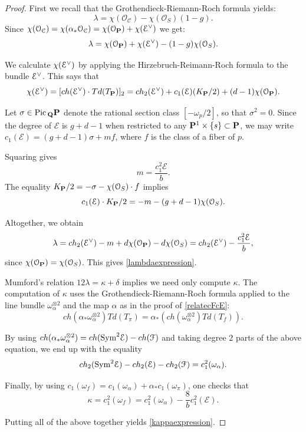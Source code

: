 \documentclass[reqno, 10 pt]{article}
\theoremstyle{definition}
\theoremstyle{remark}
\numberwithin{equation}{section}
\numberwithin{thm}{section}
\numberwithin{prop}{section}
\numberwithin{lem}{section}
\numberwithin{cor}{section}
\numberwithin{conj}{section}
\numberwithin{defn}{section}
\newcommand{\cC}{{\mathcal C}}
\newcommand{\cE}{{\mathcal E}}
\newcommand{\cF}{{\mathcal F}}
\newcommand{\cO}{{\mathcal O}}
\newcommand {\Q}{{\bf Q}}
\renewcommand{\P}{{\bf P}}
\newcommand {\Pic}{{\rm Pic}\,}
\newcommand {\Sym}{{\rm Sym}}
\begin{document}
\begin{proof}
First we recall that the Grothendieck-Riemann-Roch formula yields: 
\[\lambda = \chi (\cO_{\cC}) - \chi(\cO_{S})(1-g).\]
Since $\chi(\cO_{\cC}) = \chi(\alpha_{*}\cO_{\cC}) = \chi(\cO_{\P}) + \chi(\dual \cE)$ we get: 
\[\lambda = \chi(\cO_{\P}) + \chi(\dual \cE) - (1-g)\chi(\cO_{S}) .\]

We calculate $\chi(\dual \cE)$ by applying the Hirzebruch-Reimann-Roch formula to the bundle $\dual \cE$. This says that 
\[\chi(\dual \cE) = [ch(\dual \cE) \cdot Td(T_{\P})]_{2} = ch_{2}(\dual \cE) + c_1(\cE)(K_{\P}/2) + (d-1)\chi(\cO_{\P}).\] 

Let $\sigma \in \Pic_{\Q} \P$ denote the rational section class $[-\omega_{p}/2]$, so that $\sigma^{2} = 0$.  Since the degree of $\cE$ is $g+d-1$ when restricted to any $\P^{1} \times \{s\} \subset \P$, we may write $c_{1}(\cE) = (g+d-1)\sigma + mf$, where $f$ is the class of a fiber of $p$.  

Squaring gives \[m = \frac{c_{1}^{2}\cE}{b}.\]  The equality $K_{\P}/2 = -\sigma - \chi(\cO_{S})\cdot f$ implies \[c_{1}(\cE) \cdot K_{\P}/2 = -m - (g+d-1) \chi(\cO_{S}).\]

Altogether, we obtain \[\lambda = ch_{2}(\dual \cE) - m + d\chi(\cO_{\P}) - d\chi(\cO_{S}) = ch_{2}(\dual \cE) - \frac{c_{1}^{2}\cE}{b},\] since $\chi(\cO_{\P}) = \chi(\cO_{S})$.  This gives \eqref{lambdaexpression}.

Mumford's relation $12 \lambda = \kappa +\delta$ implies we need only compute $\kappa$. The computation of $\kappa$ uses the Grothendieck-Riemann-Roch formula applied to the line bundle $\omega_{\alpha}^{\otimes 2}$ and the map $\alpha$ as in the proof of \ref{relatecFcE}: 
\[ch(\alpha_{*}\omega_{\alpha}^{\otimes 2})Td(T_{\pi}) = \alpha_{*}(ch(\omega_{\alpha}^{\otimes 2})Td(T_{f})).\]

By using $ch(\alpha_{*}\omega_{\alpha}^{\otimes 2}) = ch(\Sym^{2}\cE) - ch(\cF)$ and taking degree $2$ parts of the above equation, we end up with the equality 
\[ch_{2}(\Sym^2\cE) - ch_{2}(\cE) - ch_{2}(\cF) = c_{1}^{2}(\omega_{\alpha}).\]

Finally, by using $c_{1}(\omega_{f}) = c_{1}(\omega_{\alpha}) + \alpha_{*}c_{1}(\omega_{\pi})$, one checks that $$\kappa = c_{1}^{2}(\omega_{f}) = c_{1}^{2}(\omega_{\alpha}) - \frac{8}{b}c_{1}^{2}(\cE).$$

Putting all of the above together yields \ref{kappaexpression}.


\end{proof}
\end{document}

